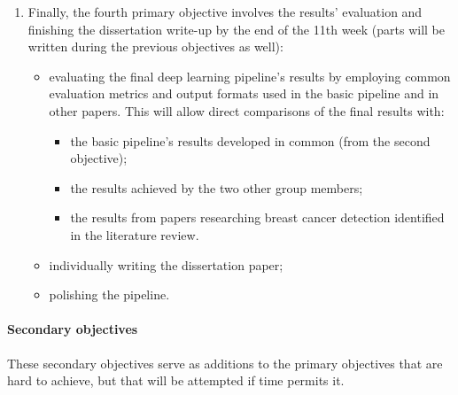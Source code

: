 \documentclass[letterpaper,12pt]{article}
\begin{document}
\begin{enumerate}
\begin{itemize}
    \end{itemize}
    \item Finally, the fourth primary objective involves the results' evaluation  and finishing the dissertation write-up by the end of the 11th week (parts will be written during the previous objectives as well):
    \begin{itemize}
        \item evaluating the final deep learning pipeline's results by employing common evaluation metrics and output formats used in the basic pipeline and in other papers. This will allow direct comparisons of the final results with:
        \begin{itemize}
            \item the basic pipeline's results developed in common (from the second objective);
            \item the results achieved by the two other group members;
            \item the results from papers researching breast cancer detection identified in the literature review.
        \end{itemize}
        \item individually writing the dissertation paper;
        \item polishing the pipeline.
    \end{itemize}
\end{enumerate}

\paragraph{Secondary objectives}  

These secondary objectives serve as additions to the primary objectives that are hard to achieve, but that will be attempted if time permits it.
\end{document}
